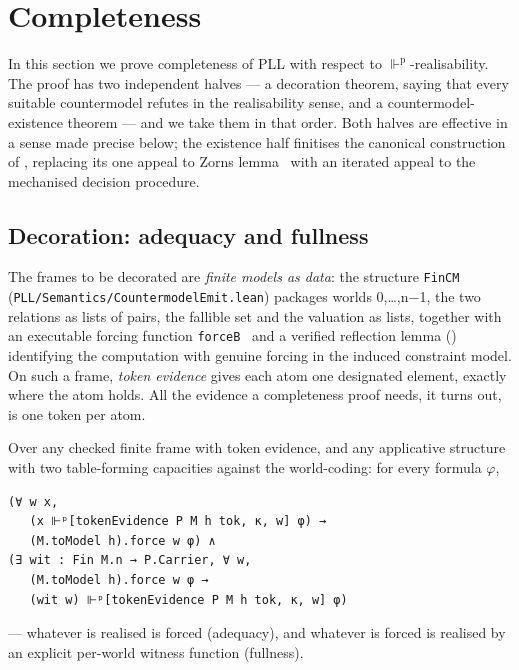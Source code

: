 \section{Completeness}\label{6-completeness}

In this section we prove completeness of PLL with respect to
\ensuremath{\Vdash^{\mathrm{p}}}-realisability. The proof has two independent halves --- a decoration
theorem, saying that every suitable countermodel refutes in the
realisability sense, and a countermodel-existence theorem --- and we take
them in that order. Both halves are effective in a sense made precise
below; the existence half finitises the canonical construction of
\cite[\S4]{FairtloughMendler1997}, replacing its one appeal to
Zorn\textquotesingle s lemma~\cite{Zorn1935} with an iterated appeal to the
mechanised decision procedure.

\subsection{Decoration: adequacy and fullness}\label{61-decoration-adequacy-and-fullness}

The frames to be decorated are \emph{finite models as data}: the structure
\texttt{FinCM}~ (\texttt{PLL/\allowbreak{}Semantics/\allowbreak{}CountermodelEmit.lean}) packages worlds 0,\ldots,n\ensuremath{-}1, the two
relations as lists of pairs, the fallible set and the valuation as
lists, together with an executable forcing function \texttt{forceB}~ and a
verified reflection lemma () identifying the computation
with genuine forcing in the induced constraint model. On such a frame,
\emph{token evidence} gives each atom one designated element, exactly where
the atom holds. All the evidence a completeness proof needs, it turns
out, is one token per atom.

\begin{theorem}\label{thm:adequacy-fullness}
Over any checked finite frame with token
evidence, and any applicative structure with two table-forming
capacities against the world-coding: for every formula \ensuremath{\varphi},

\begin{lstlisting}
(∀ w x,
   (x ⊩ᵖ[tokenEvidence P M h tok, κ, w] φ) →
   (M.toModel h).force w φ) ∧
(∃ wit : Fin M.n → P.Carrier, ∀ w,
   (M.toModel h).force w φ →
   (wit w) ⊩ᵖ[tokenEvidence P M h tok, κ, w] φ)
\end{lstlisting}

--- whatever is realised is forced (adequacy), and whatever is forced is
realised by an explicit per-world witness function (fullness).
\end{theorem}

